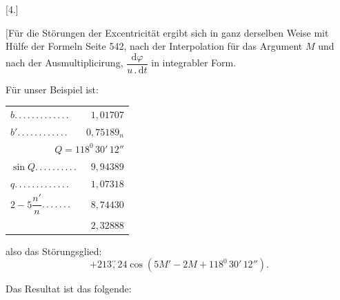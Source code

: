 \begin{landscape}
\begingroup
\fontsize{10}{13}\selectfont
{}
\renewcommand{\headrulewidth}{0pt}
\par\medskip
{}
\begin{center}[4.]\end{center}
\par\noindent\hspace*{\parindent}[Für die Störungen der Excentricität ergibt sich in ganz derselben Weise mit Hülfe der Formeln Seite 542, nach der Interpolation für das Argument \(M\) und nach der Ausmultiplicirung, \(\dfrac{\mathrm{d}\varphi}{u\mathbin{.}\mathrm{d}t}\) in integrabler Form.
\par\noindent\hspace*{\parindent}Für unser Beispiel ist:
\par
\begingroup\small
\noindent\begin{minipage}[c]{.43\textwidth}
\begin{tabular}{@{}lr@{}}
\(b\)\enspace .\,.\,.\,.\,.\,.\,.\,.\,.\,.\,.\,.\,.&\(1{,}01707\)\\
\(b'\)\enspace .\,.\,.\,.\,.\,.\,.\,.\,.\,.\,.\,.&\(0{,}75189_n\)\\
\multicolumn{2}{r}{\(Q=118^0\,30'\,12''\)}\\
\(\sin Q\)\enspace .\,.\,.\,.\,.\,.\,.\,.\,.\,.&\(9{,}94389\)\\
\(q\)\enspace .\,.\,.\,.\,.\,.\,.\,.\,.\,.\,.\,.\,.&\(1{,}07318\)\\
\(2-5\dfrac{n'}{n}\)\enspace .\,.\,.\,.\,.\,.\,.&\(8{,}74430\)\\
\hline
&\(2{,}32888\)
\end{tabular}
\end{minipage}\hfill
\begin{minipage}[c]{.55\textwidth}
also das Störungsglied:
\[
+213\overset{\prime\prime}{,}24\cos(5M'-2M+118^0\,30'\,12'').
\]
\end{minipage}\par
\endgroup
\clearpage
\endgroup
\end{landscape}
\begingroup
{}
\renewcommand{\headrulewidth}{0pt}
\par\noindent\hspace*{\parindent}Das Resultat ist das folgende:
\begingroup\small
